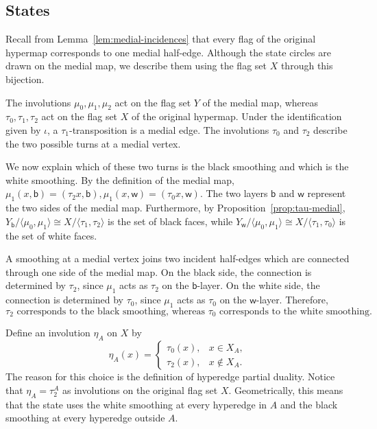 \documentclass[10pt,a4paper]{article}
\theoremstyle{definition}
\theoremstyle{remark}
\begin{document}
\subsection{States}

Recall from Lemma~\ref{lem:medial-incidences} that every flag of the original hypermap corresponds to one medial half-edge. Although the state circles are drawn on the medial
map, we describe them using the flag set $X$ through this bijection.

The involutions $\mu_0,\mu_1,\mu_2$ act on the flag set $Y$ of the medial
map, whereas $\tau_0,\tau_1,\tau_2$ act on the flag set $X$ of the original
hypermap. Under the identification given by $\iota$, a
$\tau_1$-transposition is a medial edge. The involutions $\tau_0$ and
$\tau_2$ describe the two possible turns at a medial vertex.

We now explain which of these two turns is the black smoothing and which is
the white smoothing. By the definition of the medial map,
 $\mu_1(x,\mathsf b)=(\tau_2x,\mathsf b),\mu_1(x,\mathsf w)=(\tau_0x,\mathsf w)$. The two layers $\mathsf b$ and $\mathsf w$ represent the two sides of the
medial map. Furthermore, by Proposition~\ref{prop:tau-medial},
$ Y_{\mathsf b}/\langle\mu_0,\mu_1\rangle
 \cong X/\langle\tau_1,\tau_2\rangle$ is the set of black faces, while $Y_{\mathsf w}/\langle\mu_0,\mu_1\rangle
 \cong X/\langle\tau_1,\tau_0\rangle$ is the set of white faces.

A smoothing at a medial vertex joins two incident half-edges which are
connected through one side of the medial map. On the black side, the
connection is determined by $\tau_2$, since $\mu_1$ acts as $\tau_2$ on the
$\mathsf b$-layer. On the white side, the connection is determined by
$\tau_0$, since $\mu_1$ acts as $\tau_0$ on the $\mathsf w$-layer. Therefore,
\[
 \tau_2 \text{ corresponds to the black smoothing, whereas } \tau_0 \text{ corresponds to the white smoothing}.
\]

Define an involution $\eta_A$ on $X$ by
\[
 \eta_A(x)=
 \begin{cases}
   \tau_0(x),&x\in X_A,\\
   \tau_2(x),&x\notin X_A.
 \end{cases}
\]
The reason for this choice is the definition of hyperedge partial duality.
Notice that $\eta_A=\tau_2^A$ as involutions on the original flag set $X$.
Geometrically, this means that the state uses the white smoothing at every
hyperedge in $A$ and the black smoothing at every hyperedge outside $A$.
\end{document}
